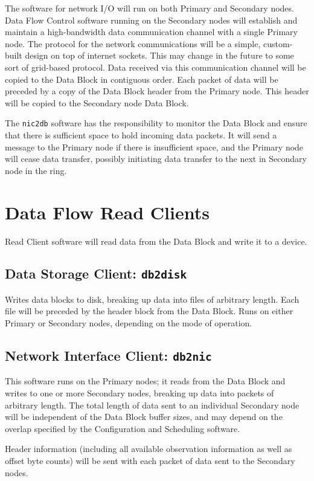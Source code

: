 The software for network I/O will run on both Primary and Secondary
nodes.  Data Flow Control software running on the Secondary nodes will
establish and maintain a high-bandwidth data communication channel
with a single Primary node.  The protocol for the network
communications will be a simple, custom-built design on top of
internet sockets.  This may change in the future to some sort of
grid-based protocol.  Data received via this communication channel
will be copied to the Data Block in contiguous order.  Each packet of
data will be preceded by a copy of the Data Block header from the
Primary node.  This header will be copied to the Secondary node Data
Block.

The {\tt nic2db} software has the responsibility to monitor the Data
Block and ensure that there is sufficient space to hold incoming data
packets.  It will send a message to the Primary node if there is
insufficient space, and the Primary node will cease data transfer,
possibly initiating data transfer to the next in Secondary node in the
ring.

\newpage
\section{Data Flow Read Clients}

Read Client software will read data from the Data Block and write it
to a device.

\subsection{Data Storage Client: {\tt db2disk}}

Writes data blocks to disk, breaking up data into files of arbitrary
length.  Each file will be preceded by the header block from the Data
Block.  Runs on either Primary or Secondary nodes, depending on the
mode of operation.

\subsection{Network Interface Client: {\tt db2nic}}

This software runs on the Primary nodes; it reads from the Data Block
and writes to one or more Secondary nodes, breaking up data into
packets of arbitrary length.  The total length of data sent to an
individual Secondary node will be independent of the Data Block buffer
sizes, and may depend on the overlap specified by the Configuration
and Scheduling software.

Header information (including all available observation information as
well as offset byte counts) will be sent with each packet of data sent
to the Secondary nodes.
